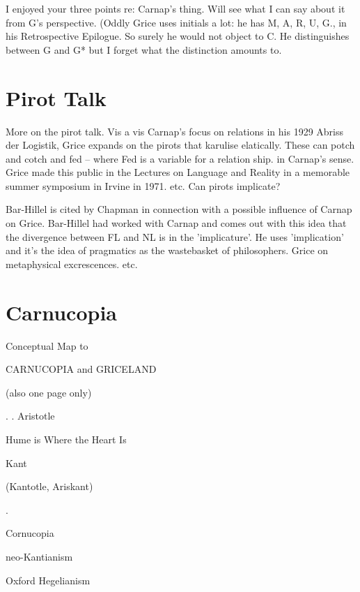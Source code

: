 \documentclass[10pt,titlepage]{book}
\begin{document}
{I enjoyed your three points re: Carnap's thing. Will see what I can say  
about it from G's perspective. (Oddly Grice uses initials a lot: he has M, A, 
R,  U, G., in his Retrospective Epilogue. So surely he would not object to 
C. He  distinguishes between G and G* but I forget what the distinction 
amounts  to.
 
\section{Pirot Talk}

More  on the pirot talk. Vis a vis Carnap’s focus on relations in his 1929  
Abriss der Logistik, Grice expands on the pirots that karulise elatically. 
These  can potch and cotch and fed – where Fed is a variable for a relation 
ship. in  Carnap's sense. Grice made this public in the Lectures on Language 
and Reality  in a  memorable summer symposium in Irvine in 1971. etc. 
Can  pirots implicate?

Bar-Hillel  is cited by Chapman in connection with a 
possible influence of Carnap on Grice.  Bar-Hillel had worked with Carnap
and comes out with this idea that the  divergence between FL and NL is in the 
'implicature'. He uses 'implication' and  it's the idea of pragmatics as 
the wastebasket of philosophers. Grice on  metaphysical excrescences. etc.  

\section{Carnucopia}

Conceptual  
 Map
                     to
 
CARNUCOPIA and   GRICELAND
 
      (also one page only)
 
 
                       .
                       .
               Aristotle
 
 
          Hume is Where the  Heart Is
 
                  Kant
 
             (Kantotle, Ariskant)
 
 
                   .
 
Cornucopia
 
neo-Kantianism
 
                                  Oxford Hegelianism
 
}
\end{document}
